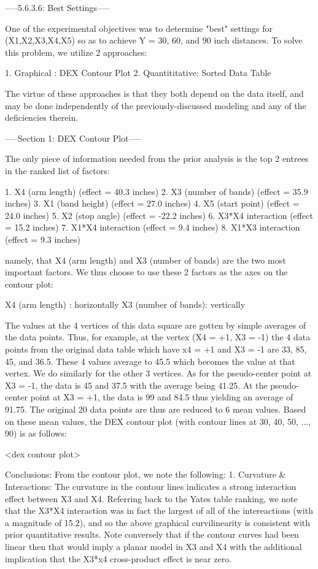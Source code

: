 -----5.6.3.6: Best Settings-----


One of the experimental objectives was to
determine "best" settings for (X1,X2,X3,X4,X5) so
as to achieve Y = 30, 60, and 90 inch distances.
To solve this problem, we utilize 2 approaches:

   1. Graphical     : DEX Contour Plot
   2. Quantititative: Sorted Data Table

The virtue of these approaches is that they both
depend on the data itself, and may be done
independently of the previously-discussed modeling
and any of the deficiencies therein.

-----Section 1: DEX Contour Plot-----

The only piece of information needed from the
prior analysis is the top 2 entrees in the ranked
list of factors:

      1. X4  (arm length)      (effect =  40.3 inches)
      2. X3  (number of bands) (effect =  35.9 inches)
      3. X1  (band height)     (effect =  27.0 inches)
      4. X5  (start point)     (effect =  24.0 inches)
      5. X2  (stop angle)      (effect = -22.2 inches)
      6. X3*X4 interaction     (effect =  15.2 inches)
      7. X1*X4 interaction     (effect =   9.4 inches)
      8. X1*X3 interaction     (effect =   9.3 inches)

namely, that X4 (arm length) and X3 (number of
bands) are the two most important factors.  We
thus choose to use these 2 factors as the axes on
the contour plot:

      X4 (arm length)     : horizontally
      X3 (number of bands): vertically

The values at the 4 vertices of this data square
are gotten by simple averages of the data points.
Thus, for example, at the vertex (X4 = +1, X3 =
-1) the 4 data points from the original data table
which have x4 = +1 and X3 = -1 are 33, 85, 45, and
36.5.  These 4 values average to 45.5 which
becomes the value at that vertex.  We do similarly
for the other 3 vertices.  As for the
pseudo-center point at X3 = -1, the data is 45 and
37.5 with the average being 41.25.  At the
pseudo-center point at X3 = +1, the data is 99 and
84.5 thus yielding an average of 91.75.  The
original 20 data points are thus are reduced to 6
mean values.  Based on these mean values, the DEX
contour plot (with contour lines at 30, 40, 50,
..., 90) is as follows:

   <dex contour plot>

Conclusions:
From the contour plot, we note the following:
   1. Curvature & Interactions: The curvature in
      the contour lines indicates a strong
      interaction effect between X3 and X4.
      Referring back to the Yates table ranking,
      we note that the X3*X4 interaction was in
      fact the largest of all of the intereactions
      (with a magnitude of 15.2), and so the above
      graphical curvilinearity is consistent with
      prior quantitative results.  Note conversely
      that if the contour curves had been linear
      then that would imply a planar model in X3
      and X4 with the additional implication that
      the X3*x4 cross-product effect is near zero.

